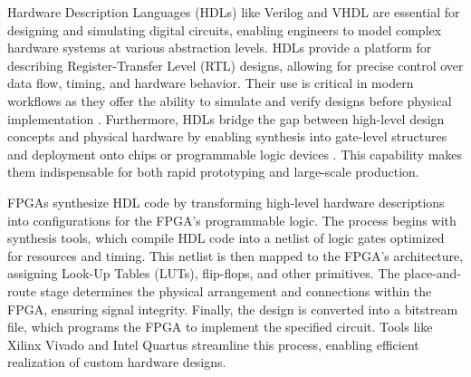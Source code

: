 Hardware Description Languages (HDLs) like Verilog and VHDL are essential for designing and simulating digital circuits, enabling engineers to model complex hardware systems at various abstraction levels.
HDLs provide a platform for describing Register-Transfer Level (RTL) designs, allowing for precise control over data flow, timing, and hardware behavior.
Their use is critical in modern workflows as they offer the ability to simulate and verify designs before physical implementation \cite{katz_contemporary_2005}.
Furthermore, HDLs bridge the gap between high-level design concepts and physical hardware by enabling synthesis into gate-level structures and deployment onto chips or programmable logic devices \cite{pedroni_circuit_2004}.
This capability makes them indispensable for both rapid prototyping and large-scale production.

FPGAs synthesize HDL code by transforming high-level hardware descriptions into configurations for the FPGA's programmable logic.
The process begins with synthesis tools, which compile HDL code into a netlist of logic gates optimized for resources and timing.
This netlist is then mapped to the FPGA's architecture, assigning Look-Up Tables (LUTs), flip-flops, and other primitives.
The place-and-route stage determines the physical arrangement and connections within the FPGA, ensuring signal integrity.
Finally, the design is converted into a bitstream file, which programs the FPGA to implement the specified circuit.
Tools like Xilinx Vivado \cite{noauthor_amd_nodate} and Intel Quartus \cite{noauthor_fpga_nodate} streamline this process, enabling efficient realization of custom hardware designs.

